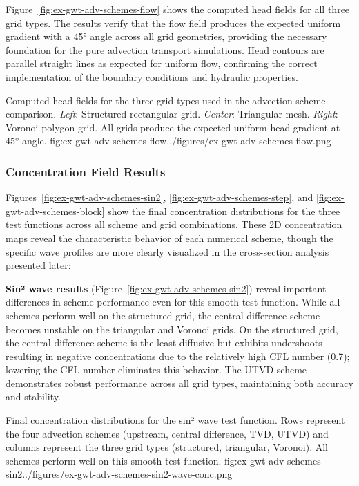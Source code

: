 Figure~\ref{fig:ex-gwt-adv-schemes-flow} shows the computed head fields for all three grid types. The results verify that the flow field produces the expected uniform gradient with a 45° angle across all grid geometries, providing the necessary foundation for the pure advection transport simulations. Head contours are parallel straight lines as expected for uniform flow, confirming the correct implementation of the boundary conditions and hydraulic properties.

\begin{StandardFigure}{
    Computed head fields for the three grid types used in the advection scheme comparison. \textit{Left}: Structured rectangular grid. \textit{Center}: Triangular mesh. \textit{Right}: Voronoi polygon grid. All grids produce the expected uniform head gradient at 45° angle.
}{fig:ex-gwt-adv-schemes-flow}{../figures/ex-gwt-adv-schemes-flow.png}
\end{StandardFigure}

\subsubsection{Concentration Field Results}

Figures~\ref{fig:ex-gwt-adv-schemes-sin2}, \ref{fig:ex-gwt-adv-schemes-step}, and \ref{fig:ex-gwt-adv-schemes-block} show the final concentration distributions for the three test functions across all scheme and grid combinations. These 2D concentration maps reveal the characteristic behavior of each numerical scheme, though the specific wave profiles are more clearly visualized in the cross-section analysis presented later:

\textbf{Sin² wave results} (Figure~\ref{fig:ex-gwt-adv-schemes-sin2}) reveal important differences in scheme performance even for this smooth test function. While all schemes perform well on the structured grid, the central difference scheme becomes unstable on the triangular and Voronoi grids. On the structured grid, the central difference scheme is the least diffusive but exhibits undershoots resulting in negative concentrations due to the relatively high CFL number (0.7); lowering the CFL number eliminates this behavior. The UTVD scheme demonstrates robust performance across all grid types, maintaining both accuracy and stability.
\begin{StandardFigure}{
    Final concentration distributions for the sin² wave test function. Rows represent the four advection schemes (upstream, central difference, TVD, UTVD) and columns represent the three grid types (structured, triangular, Voronoi). All schemes perform well on this smooth test function.
}{fig:ex-gwt-adv-schemes-sin2}{../figures/ex-gwt-adv-schemes-sin2-wave-conc.png}
\end{StandardFigure}

